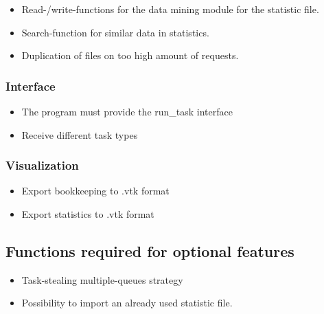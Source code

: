 {\begin{itemize}
				\item Read-/write-functions for the data mining module for the statistic file.
				\item Search-function for similar data in statistics.
				\item Duplication of files on too high amount of requests.
			\end{itemize}
	
	
	\subsubsection{Interface}
	
		\begin{itemize}
			\item The program must provide the run\_task interface
			\item Receive different task types
		\end{itemize}
		
		
	\subsubsection{Visualization}
	
		\begin{itemize}
			\item Export bookkeeping to .vtk format
			\item Export statistics to .vtk format
		\end{itemize}
		
	\subsection{Functions required for optional features}
	
		\begin{itemize}
			\item Task-stealing multiple-queues strategy%
			\item Possibility to import an already used statistic file.%
		\end{itemize}
}

